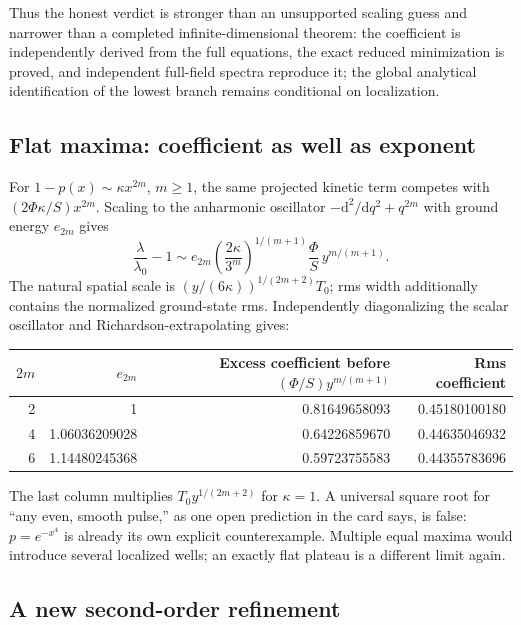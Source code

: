 \documentclass[11pt,a4paper]{article}
\newcommand{\dd}{\mathrm d}
\newcommand{\lzero}{\lambda_0}
\begin{document}
Thus the honest verdict is stronger than an unsupported scaling guess and narrower than a completed infinite-dimensional theorem: the coefficient is independently derived from the full equations, the exact reduced minimization is proved, and independent full-field spectra reproduce it; the global analytical identification of the lowest branch remains conditional on localization.

\subsection{Flat maxima: coefficient as well as exponent}

For $1-p(x)\sim\kappa x^{2m}$, $m\ge1$, the same projected kinetic term competes with $(2\Phi\kappa/S)x^{2m}$. Scaling to the anharmonic oscillator $-\dd^2/\dd q^2+q^{2m}$ with ground energy $e_{2m}$ gives
\begin{equation}\label{eq:flatlaw}
\boxed{\frac{\lambda}{\lzero}-1
\sim e_{2m}\left(\frac{2\kappa}{3^m}\right)^{1/(m+1)}
\frac{\Phi}{S}\,y^{m/(m+1)}.}
\end{equation}
The natural spatial scale is $(y/(6\kappa))^{1/(2m+2)}T_0$; rms width additionally contains the normalized ground-state rms. Independently diagonalizing the scalar oscillator and Richardson-extrapolating gives:
\begin{center}
\begin{tabular}{@{}rrrr@{}}\toprule
$2m$ & $e_{2m}$ & Excess coefficient before $(\Phi/S)y^{m/(m+1)}$ & Rms coefficient \\\midrule
2 & 1 & 0.81649658093 & 0.45180100180 \\
4 & 1.06036209028 & 0.64226859670 & 0.44635046932 \\
6 & 1.14480245368 & 0.59723755583 & 0.44355783696 \\\bottomrule
\end{tabular}
\end{center}
The last column multiplies $T_0y^{1/(2m+2)}$ for $\kappa=1$. A universal square root for ``any even, smooth pulse,'' as one open prediction in the card says, is false: $p=e^{-x^4}$ is already its own explicit counterexample. Multiple equal maxima would introduce several localized wells; an exactly flat plateau is a different limit again.

\subsection{A new second-order refinement}
\end{document}
